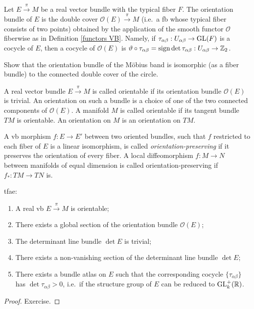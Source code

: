 \begin{defn}
    Let $E\overset\pi\to M$ be a real vector bundle with the typical fiber $F$. The orientation bundle of $E$ is the double cover $\mathcal{O}(E)\overset{\pi}\to M$ (i.e.\ a \gls{fb} whose typical fiber consists of two points) obtained by the application of the smooth functor $\mathcal{O}$ fiberwise as in Definition \ref{functors VB}. Namely, if $\tau_{\alpha\beta}:U_{\alpha\beta}\to\operatorname{GL}(F)$ is a cocycle of $E$, then a cocycle of $\mathcal{O}(E)$ is $\vartheta\circ\tau_{\alpha\beta}=\operatorname{sign}\det\tau_{\alpha\beta}:U_{\alpha\beta}\to\mathbb{Z}_2$.
\end{defn}

\begin{xca}
    Show that the orientation bundle of the M\"obius band is isomorphic (as a fiber bundle) to the connected double cover of the circle.
\end{xca}

\begin{defn}
    A real vector bundle $E\overset\pi\to M$ is called orientable if its orientation bundle $\mathcal{O}(E)$ is trivial. An orientation on such a bundle is a choice of one of the two connected components of $\mathcal{O}(E)$. A manifold $M$ is called orientable if its tangent bundle $TM$ is orientable. An orientation on $M$ is an orientation on $TM$.

    A \gls{vb} morphism $f:E\to E'$ between two oriented bundles, such that $f$ restricted to each fiber of $E$ is a linear isomorphism, is called \emph{orientation-preserving} if it preserves the orientation of every fiber. A local diffeomorphism $f:M\to N$ between manifolds of equal dimension is called orientation-preserving if $f_\ast:TM\to TN$ is.
\end{defn}

\begin{prop}\label{prop orientation}
\gls{tfae}:
\begin{enumerate}
    \item A real \gls{vb} $E\overset\pi\to M$ is orientable;
    \item There exists a global section of the orientation bundle $\mathcal{O}(E)$;
    \item The determinant line bundle $\det E$ is trivial;
    \item There exists a non-vanishing section of the determinant line bundle $\det E$;
    \item There exists a bundle atlas on $E$ such that the corresponding cocycle $\{\tau_{\alpha\beta}\}$ has $\det\tau_{\alpha\beta}>0$, i.e.\ if the structure group of $E$ can be reduced to $\operatorname{GL}^+_k(\mathbb{R} )$.
\end{enumerate}
\end{prop}
\begin{proof}
    Exercise.
\end{proof}

